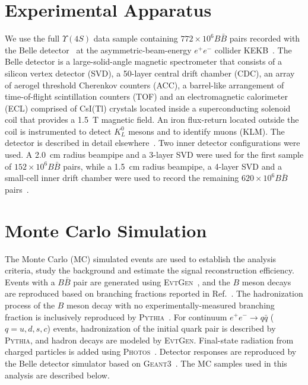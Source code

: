 \documentclass[aps,prd,twocolumn,superscriptaddress,showpacs,preprintnumbers,amsmath,amssymb]{revtex4-1}
\begin{document}
\section{Experimental Apparatus}

We use the full $\Upsilon(4S)$ data sample containing $772 \times 10^6 B\bar{B}$ pairs recorded with the Belle detector~\cite{cite:Belle-detector:2002} at the asymmetric-beam-energy $e^+ e^-$ collider KEKB~\cite{cite:KEKB:2003}. The Belle detector is a large-solid-angle magnetic spectrometer that consists of a silicon vertex detector (SVD), a 50-layer central drift chamber (CDC), an array of aerogel threshold Cherenkov counters (ACC), a barrel-like arrangement of time-of-flight scintillation counters (TOF) and an electromagnetic calorimeter (ECL) comprised of CsI(Tl) crystals located inside a superconducting solenoid coil that provides a 1.5~T magnetic field. An iron flux-return located outside the coil is instrumented to detect $K_L^0$ mesons and to identify muons (KLM). The detector is described in detail elsewhere~\cite{cite:Belle-detector:2002}. Two inner detector configurations were used. A 2.0~cm radius beampipe and a 3-layer SVD were used for the first sample of $152 \times 10^6 B\bar{B}$ pairs, while a 1.5~cm radius beampipe, a 4-layer SVD and a small-cell inner drift chamber were used to record the remaining $620 \times 10^6 B\bar{B}$ pairs~\cite{cite:SVD2:2006}.



\section{Monte Carlo Simulation}

The Monte Carlo (MC) simulated events are used to establish the analysis criteria, study the background and estimate the signal reconstruction efficiency. Events with a $B \bar{B}$ pair are generated using \textsc{EvtGen}~\cite{cite:EvtGen:2001}, and the $B$ meson decays are reproduced based on branching fractions reported in Ref.~\cite{cite:PDG:2016}. The hadronization process of the $B$ meson decay with no experimentally-measured branching fraction is inclusively reproduced by \textsc{Pythia}~\cite{cite:PYTHIA:2006}. For continuum $e^+ e^- \rightarrow q{\bar q}$ ($q = u, d, s, c$) events, hadronization of the initial quark pair is described by \textsc{Pythia}, and hadron decays are modeled by \textsc{EvtGen}. Final-state radiation from charged particles is added using \textsc{Photos}~\cite{cite:PHOTOS:2016}. Detector responses are reproduced by the Belle detector simulator based on \textsc{Geant}3~\cite{cite:GEANT:1984}. The MC samples used in this analysis are described below.
\end{document}

